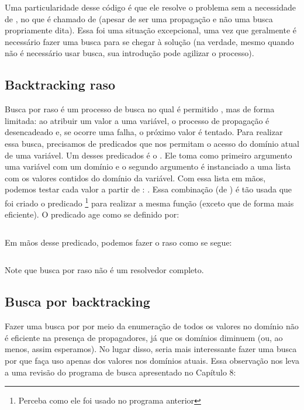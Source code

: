 Uma particularidade desse código é que ele resolve o problema sem a necessidade de
, no que é chamado de  (apesar de ser
uma propagação e não uma busca propriamente dita). Essa foi uma
situação excepcional, uma vez que geralmente é necessário fazer uma busca para se chegar à solução
(na verdade, mesmo quando não é necessário usar busca, sua introdução pode agilizar o processo).

\subsection{Backtracking raso}

Busca por  raso é um processo de busca no qual é permitido
, mas de forma limitada: ao atribuir um valor a uma variável, o processo de
propagação é desencadeado e, se ocorre uma falha, o próximo valor é tentado. Para realizar essa
busca, precisamos de predicados que nos permitam o acesso do domínio atual de uma variável. Um
desses predicados é o . Ele toma como primeiro argumento uma
variável com um domínio e o segundo argumento é instanciado a uma lista com os valores contidos do
domínio da variável. Com essa lista em mãos, podemos testar cada valor a partir de
: . Essa combinação
(de ) é tão usada que foi criado o predicado
\footnote{Perceba como ele foi usado no programa anterior} para realizar a mesma
função (exceto que de forma mais eficiente). O predicado  age como se definido por:

\inputminted{prolog}{../Exemplos/Cap10/prog2_indomain.pl}

Em mãos desse predicado, podemos fazer o  raso como se segue:

\inputminted{prolog}{../Exemplos/Cap10/prog3_backraso.ecl}

Note que busca por  raso não é um resolvedor completo.

\subsection{Busca por backtracking}

Fazer uma busca por  por meio da enumeração de todos os valores no domínio
não é eficiente na presença de propagadores, já que os domínios diminuem (ou, ao menos, assim
esperamos). No lugar disso, seria mais interessante fazer uma busca por \backtracking que faça uso
apenas dos valores nos domínios atuais. Essa observação nos leva a uma revisão do programa de busca
apresentado no Capítulo 8: %

